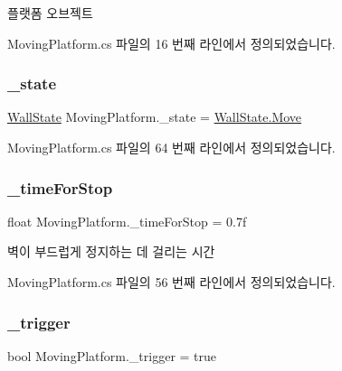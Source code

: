 플랫폼 오브젝트 



Moving\+Platform.\+cs 파일의 16 번째 라인에서 정의되었습니다.

\mbox{\label{class_moving_platform_abd03a1d4800fd5fa8ab4ef8ce5a688db}} 
\subsubsection{\texorpdfstring{\_state}{\_state}}
{\footnotesize\ttfamily \mbox{\hyperlink{class_moving_platform_ac47e764b71989317aab0bad26d82a901}{Wall\+State}} Moving\+Platform.\+\_\+state = \mbox{\hyperlink{class_moving_platform_ac47e764b71989317aab0bad26d82a901a6bc362dbf494c61ea117fe3c71ca48a5}{Wall\+State.\+Move}}\hspace{0.3cm}{\ttfamily [private]}}



Moving\+Platform.\+cs 파일의 64 번째 라인에서 정의되었습니다.

\mbox{\label{class_moving_platform_a69791dc347a05d5513e82cd445640cf4}} 
\subsubsection{\texorpdfstring{\_timeForStop}{\_timeForStop}}
{\footnotesize\ttfamily float Moving\+Platform.\+\_\+time\+For\+Stop = 0.\+7f\hspace{0.3cm}{\ttfamily [private]}}



벽이 부드럽게 정지하는 데 걸리는 시간 



Moving\+Platform.\+cs 파일의 56 번째 라인에서 정의되었습니다.

\mbox{\label{class_moving_platform_a98e69f4b8bfe702ef2bc6a8d77a03b8a}} 
\subsubsection{\texorpdfstring{\_trigger}{\_trigger}}
{\footnotesize\ttfamily bool Moving\+Platform.\+\_\+trigger = true\hspace{0.3cm}{\ttfamily [private]}}




